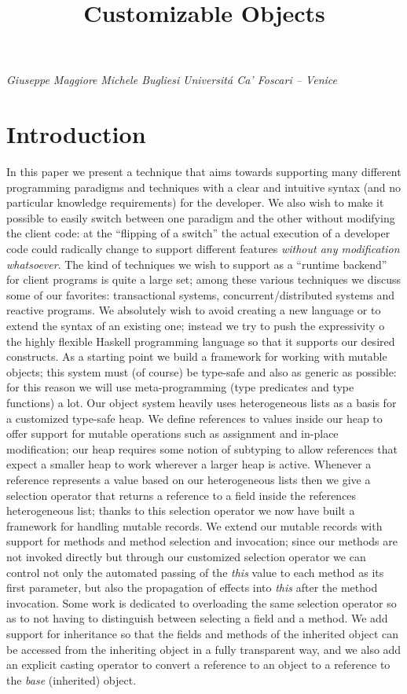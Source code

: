 \documentclass[a4paper]{article}
\begin{document}

\title{Customizable Objects}

\textit{Giuseppe Maggiore}
\textit{Michele Bugliesi}
\textit{Universitá Ca'  Foscari -- Venice}

 
\section{Introduction}

 In this paper we present a technique that aims towards supporting many different programming paradigms and techniques with a clear and intuitive syntax (and no particular knowledge requirements) for the developer. We also wish to make it possible to easily switch between one paradigm and the other without modifying the client code: at the ``flipping of a switch'' the actual execution of a developer code could radically change to support different features \textit{without any modification whatsoever}. The kind of techniques we wish to support as a ``runtime backend'' for client programs is quite a large set; among these various techniques we discuss some of our favorites: transactional systems, concurrent/distributed systems and reactive programs. We absolutely wish to avoid creating a new language or to extend the syntax of an existing one; instead we try to push the expressivity o the highly flexible Haskell programming language so that it supports our desired constructs. As a starting point we build a framework for working with mutable objects; this system must (of course) be type-safe and also as generic as possible: for this reason we will use meta-programming (type predicates and type functions) a lot. Our object system heavily uses heterogeneous lists as a basis for a customized type-safe heap. We define references to values inside our heap to offer support for mutable operations such as assignment and in-place modification; our heap requires some notion of subtyping to allow references that expect a smaller heap to work wherever a larger heap is active. Whenever a reference represents a value based on our heterogeneous lists then we give a selection operator that returns a reference to a field inside the references heterogeneous list; thanks to this selection operator we now have built a framework for handling mutable records. We extend our mutable records with support for methods and method selection and invocation; since our methods are not invoked directly but through our customized selection operator we can control not only the automated passing of the \textit{this} value to each method as its first parameter, but also the propagation of effects into \textit{this }after the method invocation. Some work is dedicated to overloading the same selection operator so as to not having to distinguish between selecting a field and a method. We add support for inheritance so that the fields and methods of the inherited object can be accessed from the inheriting object in a fully transparent way, and we also add an explicit casting operator to convert a reference to an object to a reference to the \textit{base} (inherited) object.
\end{document}
